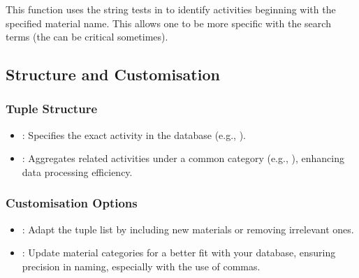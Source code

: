 \documentclass[letterpaper,10pt,english]{sphinxmanual}
\begin{document}
\sphinxAtStartPar
This function uses the string tests  in  to identify activities beginning with the specified material name. This allows one to be more specific with the search terms (the \sphinxcode{\sphinxupquote{,}} can be critical sometimes).


\subsection{Structure and Customisation}
\label{\detokenize{configuration:structure-and-customisation}}

\subsubsection{Tuple Structure}
\label{\detokenize{configuration:tuple-structure}}\begin{itemize}
\item {} 
\sphinxAtStartPar
{}: Specifies the exact activity in the database (e.g., ).

\item {} 
\sphinxAtStartPar
{}: Aggregates related activities under a common category (e.g., ), enhancing data processing efficiency.

\end{itemize}


\subsubsection{Customisation Options}
\label{\detokenize{configuration:customisation-options}}\begin{itemize}
\item {} 
\sphinxAtStartPar
{}: Adapt the tuple list by including new materials or removing irrelevant ones.

\item {} 
\sphinxAtStartPar
{}: Update material categories for a better fit with your database, ensuring precision in naming, especially with the use of commas.

\end{itemize}
\end{document}
